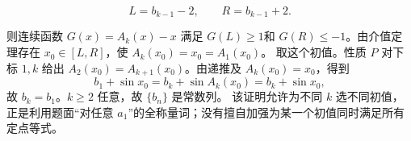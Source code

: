 \begin{answer}
\nopagebreak[4]
\[
L=b_{k-1}-2,\qquad R=b_{k-1}+2.
\]

则连续函数 \(G(x)=A_k(x)-x\) 满足 \(G(L)\ge1\)和 \(G(R)\le-1\)。由介值定理存在 \(x_0\in[L,R]\)，使 \(A_k(x_0)=x_0=A_1(x_0)\)。
取这个初值。性质 \(P\) 对下标 \(1,k\) 给出 \(A_2(x_0)=A_{k+1}(x_0)\)。由递推及 \(A_k(x_0)=x_0\)，得到
\nopagebreak[4]
\[
b_1+\sin x_0=b_k+\sin A_k(x_0)=b_k+\sin x_0,
\]
故 \(b_k=b_1\)。\(k\ge2\) 任意，故 \(\{b_n\}\) 是常数列。
该证明允许为不同 \(k\) 选不同初值，正是利用题面“对任意 \(a_1\)”的全称量词；没有擅自加强为某一个初值同时满足所有定点等式。





\end{answer}